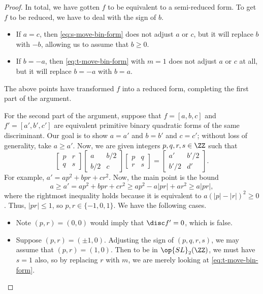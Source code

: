 \documentclass[../notes.tex]{subfiles}
\begin{document}
\begin{proof}
	In total, we have gotten $f$ to be equivalent to a semi-reduced form. To get $f$ to be reduced, we have to deal with the sign of $b$.
	\begin{itemize}
		\item If $a=c$, then \eqref{eq:s-move-bin-form} does not adjust $a$ or $c$, but it will replace $b$ with $-b$, allowing us to assume that $b\ge0$.
		\item If $b=-a$, then \eqref{eq:t-move-bin-form} with $m=1$ does not adjust $a$ or $c$ at all, but it will replace $b=-a$ with $b=a$.
	\end{itemize}
	The above points have transformed $f$ into a reduced form, completing the first part of the argument.

	For the second part of the argument, suppose that $f=[a,b,c]$ and $f'=[a',b',c']$ are equivalent primitive binary quadratic forms of the same discriminant. Our goal is to show $a=a'$ and $b=b'$ and $c=c'$; without loss of generality, take $a\ge a'$. Now, we are given integers $p,q,r,s\in\ZZ$ such that
	\[\begin{bmatrix}
		p & r \\
		q & s
	\end{bmatrix}\begin{bmatrix}
		a & b/2 \\
		b/2 & c
	\end{bmatrix}\begin{bmatrix}
		p & q \\
		r & s
	\end{bmatrix}=\begin{bmatrix}
		a' & b'/2 \\
		b'/2 & d'
	\end{bmatrix}.\]
	For example, $a'=ap^2+bpr+cr^2$. Now, the main point is the bound
	\begin{equation}
		a\ge a'=ap^2+bpr+cr^2\ge ap^2-a\left|pr\right|+ar^2\ge a\left|pr\right|, \label{eq:main-reduced-form-bound}
	\end{equation}
	where the rightmost inequality holds because it is equivalent to $a\left(\left|p\right|-\left|r\right|\right)^2\ge0$. Thus, $\left|pr\right|\le1$, so $p,r\in\{-1,0,1\}$. We have the following cases.
	\begin{itemize}
		\item Note $(p,r)=(0,0)$ would imply that $\disc f'=0$, which is false.
		\item Suppose $(p,r)=(\pm1,0)$. Adjusting the sign of $(p,q,r,s)$, we may assume that $(p,r)=(1,0)$. Then to be in $\op{SL}_2(\ZZ)$, we must have $s=1$ also, so by replacing $r$ with $m$, we are merely looking at \eqref{eq:t-move-bin-form}.
		

\end{itemize}
\end{proof}
\end{document}
